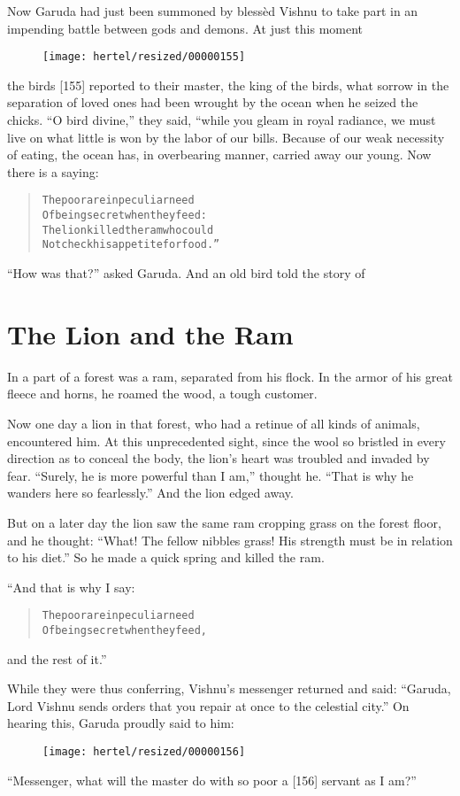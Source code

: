 \documentclass[article, twoside, 10pt]{memoir}
\renewenvironment{verbatim}{%
\begin{quote}%
\vskip -10pt%
\begin{alltt}\normalfont\small}{\end{alltt}%
\end{quote}%
\vskip -10pt
} %
\begin{document}
Now Garuda had just been summoned by blessèd Vishnu to take part in
an impending battle between gods and demons. At just this moment
\begin{figure}[p]\texttt{[image: hertel/resized/00000155]}\end{figure}the birds [155] reported to their master, the king of the birds,
what sorrow in the separation of loved ones had been wrought by the
ocean when he seized the chicks. ``O bird divine,'' they said,
“while you gleam in royal radiance, we must live on what little is
won by the labor of our bills. Because of our weak necessity of
eating, the ocean has, in overbearing manner, carried away our
young. Now there is a saying:

\begin{verbatim}
The poor are in peculiar need
Of being secret when they feed:
The lion killed the ram who could
Not check his appetite for food.”
\end{verbatim}
``How was that?'' asked Garuda. And an old bird told the story of

\chapter{The Lion and the Ram}

In a part of a forest was a ram, separated from his flock. In the
armor of his great fleece and horns, he roamed the wood, a tough
customer.

Now one day a lion in that forest, who had a retinue of all kinds
of animals, encountered him. At this unprecedented sight, since the
wool so bristled in every direction as to conceal the body, the
lion's heart was troubled and invaded by fear.
``Surely, he is more powerful than I am,'' thought he.
``That is why he wanders here so fearlessly.'' And the lion edged
away.

But on a later day the lion saw the same ram cropping grass on the
forest floor, and he thought:
``What! The fellow nibbles grass! His strength must be in relation to his diet.''
So he made a quick spring and killed the ram.

“And that is why I say:

\begin{verbatim}
The poor are in peculiar need
Of being secret when they feed,
\end{verbatim}
and the rest of it.”

While they were thus conferring, Vishnu's messenger returned and
said:
``Garuda, Lord Vishnu sends orders that you repair at once to the celestial city.''
On hearing this, Garuda proudly said to him:
\begin{figure}[p]\texttt{[image: hertel/resized/00000156]}\end{figure}``Messenger, what will the master do with so poor a [156] servant as I am?''
\end{document}
